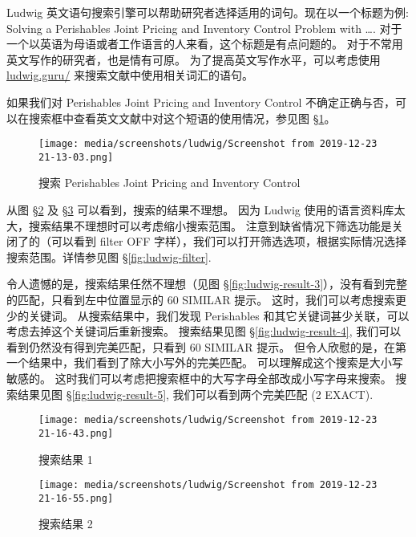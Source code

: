 \documentclass[
    11pt,
    base=hide,
    cite=authoryear,
    device=phone,
    lang=cn,
    mode=simple,
    result=answer,
    toc=onecol,
]{elegantbook_sierxue}
\begin{document}
Ludwig 英文语句搜索引擎可以帮助研究者选择适用的词句。现在以一个标题为例:
Solving a Perishables Joint Pricing and Inventory Control Problem
with \ldots.
对于一个以英语为母语或者工作语言的人来看，这个标题是有点问题的。
对于不常用英文写作的研究者，也是情有可原。
为了提高英文写作水平，可以考虑使用
\href{https://ludwig.guru/}{ludwig.guru/} 来搜索文献中使用相关词汇的语句。

如果我们对 Perishables Joint Pricing and Inventory Control
不确定正确与否，可以在搜索框中查看英文文献中对这个短语的使用情况，参见图
\S\ref{fig:ludwig-search}。

\begin{figure}[!htbp]
  \centering
  \texttt{[image: media/screenshots/ludwig/Screenshot from 2019-12-23 21-13-03.png]}
  \caption{搜索 Perishables Joint Pricing and Inventory Control}%
  \label{fig:ludwig-search}
\end{figure}

从图 \S\ref{fig:ludwig-result-1} 及 \S\ref{fig:ludwig-result-2}
可以看到，搜索的结果不理想。
因为 Ludwig 使用的语言资料库太大，搜索结果不理想时可以考虑缩小搜索范围。
注意到缺省情况下筛选功能是关闭了的（可以看到 filter OFF
字样），我们可以打开筛选选项，根据实际情况选择搜索范围。详情参见图
\S\ref{fig:ludwig-filter}.

令人遗憾的是，搜索结果任然不理想（见图
\S\ref{fig:ludwig-result-3}），没有看到完整的匹配，只看到左中位置显示的 60
SIMILAR 提示。
这时，我们可以考虑搜索更少的关键词。
从搜索结果中，我们发现 Perishables
和其它关键词甚少关联，可以考虑去掉这个关键词后重新搜索。
搜索结果见图 \S\ref{fig:ludwig-result-4},
我们可以看到仍然没有得到完美匹配，只看到 60 SIMILAR 提示。
但令人欣慰的是，在第一个结果中，我们看到了除大小写外的完美匹配。
可以理解成这个搜索是大小写敏感的。
这时我们可以考虑把搜索框中的大写字母全部改成小写字母来搜索。
搜索结果见图 \S\ref{fig:ludwig-result-5}, 我们可以看到两个完美匹配
(2 EXACT).

\begin{figure}[!htbp]
  \centering
  \texttt{[image: media/screenshots/ludwig/Screenshot from 2019-12-23 21-16-43.png]}
  \caption{搜索结果 1}%
  \label{fig:ludwig-result-1}
\end{figure}

\begin{figure}[!htbp]
  \centering
  \texttt{[image: media/screenshots/ludwig/Screenshot from 2019-12-23 21-16-55.png]}
  \caption{搜索结果 2}%
  \label{fig:ludwig-result-2}
\end{figure}
\end{document}
